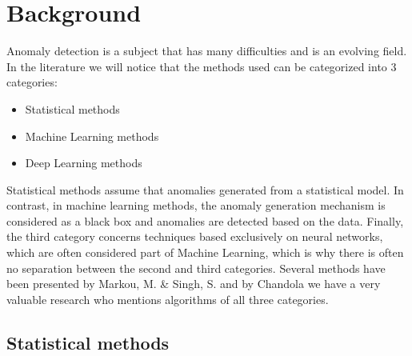 \documentclass[a4paper,12pt]{report}
\theoremstyle{definitionNODot}
\begin{document}
	\chapter{Background}
	Anomaly detection is a subject that has many difficulties and is an evolving field. In the literature we will notice that the methods used can be categorized into 3 categories:
	
	\begin{itemize}
		\item Statistical methods
		\item Machine Learning methods
		\item Deep Learning methods
	\end{itemize}
	
	Statistical methods assume that anomalies generated from a statistical model. In contrast, in machine learning methods, the anomaly generation mechanism is considered as a black box and anomalies are detected based on the data. Finally, the third category concerns techniques based exclusively on neural networks, which are often considered part of Machine Learning, which is why there is often no separation between the second and third categories. Several methods have been presented by Markou, M. \& Singh, S. \cite{Singh2003Novelty, markou2003novelty} and by Chandola we have a very valuable research \cite{Chandola, chandola2009anomaly} who mentions algorithms of all three categories.
	
	\section{Statistical methods}
	
\end{document}

